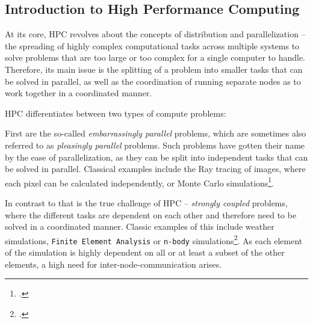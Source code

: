 \subsection{Introduction to High Performance Computing}

At its core, \ac{HPC} revolves about the concepts of distribution and parallelization -- the spreading of highly complex computational tasks across multiple systems
to solve problems that are too large or too complex for a single computer to handle.
Therefore, its main issue is the splitting of a problem into smaller tasks that can be solved in parallel, as well as the coordination of running separate nodes as to work together in a coordinated manner.

\ac{HPC} differentiates between two types of compute problems:

First are the so-called \textit{embarrassingly parallel} problems, which are sometimes also referred to as \textit{pleasingly parallel} problems.
Such problems have gotten their name by the ease of parallelization, as they can be split into independent tasks that can be solved in parallel.
Classical examples include the Ray tracing of images, where each pixel can be calculated independently,
or Monte Carlo simulations\footcite{gandyAdvancedComputationalMethods}.

In contrast to that is the true challenge of \ac{HPC} -- \textit{strongly coupled} problems,
where the different tasks are dependent on each other and therefore need to be solved in a coordinated manner.
Classic examples of this include weather simulations, \texttt{Finite Element Analysis} or \texttt{n-body} simulations\footcite{capuzzo-dolcettaFullyParallelHigh2013}.
As each element of the simulation is highly dependent on all or at least a subset of the other elements,
a high need for inter-node-communication arises.

